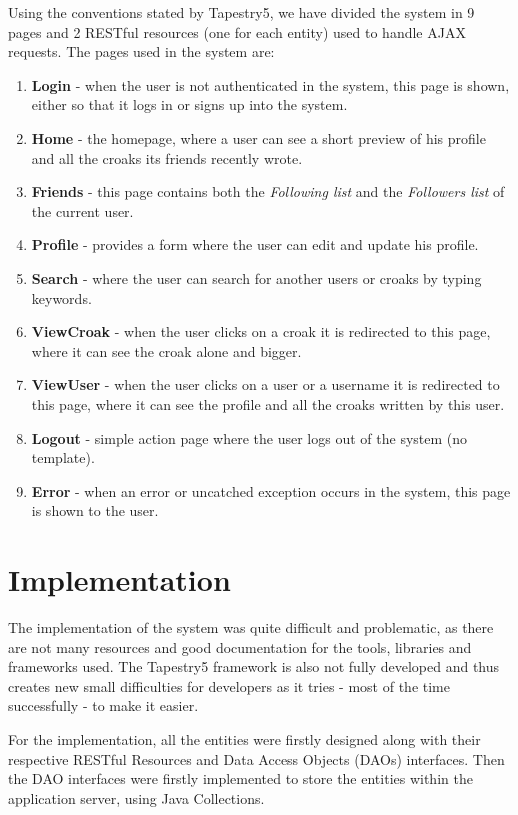 \documentclass[paper=a4, fontsize=12pt]{scrartcl}
\numberwithin{equation}{section}    %
\numberwithin{figure}{section}      %
\numberwithin{table}{section}        %
\begin{document}
Using the conventions stated by Tapestry5, we have divided the system in 9 pages and 2 RESTful resources (one for each entity) used to handle AJAX requests.
The pages used in the system are:
\begin{enumerate}
  \item \textbf{Login} - when the user is not authenticated in the system, this page is shown, either so that it logs in or signs up into the system.
  \item \textbf{Home} - the homepage, where a user can see a short preview of his profile and all the croaks its friends recently wrote.
  \item \textbf{Friends} - this page contains both the \emph{Following list} and the \emph{Followers list} of the current user.
  \item \textbf{Profile} - provides a form where the user can edit and update his profile.
  \item \textbf{Search} - where the user can search for another users or croaks by typing keywords.
  \item \textbf{ViewCroak} - when the user clicks on a croak it is redirected to this page, where it can see the croak alone and bigger.
  \item \textbf{ViewUser} - when the user clicks on a user or a username it is redirected to this page, where it can see the profile and all the croaks written by this user.
  \item \textbf{Logout} - simple action page where the user logs out of the system (no template).
  \item \textbf{Error} - when an error or uncatched exception occurs in the system, this page is shown to the user.
\end{enumerate}

\pagebreak
\section{Implementation}
The implementation of the system was quite difficult and problematic, as there are
not many resources and good documentation for the tools, libraries and frameworks used.
The Tapestry5 framework is also not fully developed and thus creates new small difficulties for developers
as it tries - most of the time successfully - to make it easier.

For the implementation, all the entities were firstly designed along with their respective
RESTful Resources and Data Access Objects (DAOs) interfaces. Then the DAO interfaces were
firstly implemented to store the entities within the application server, using Java Collections.
\end{document}
